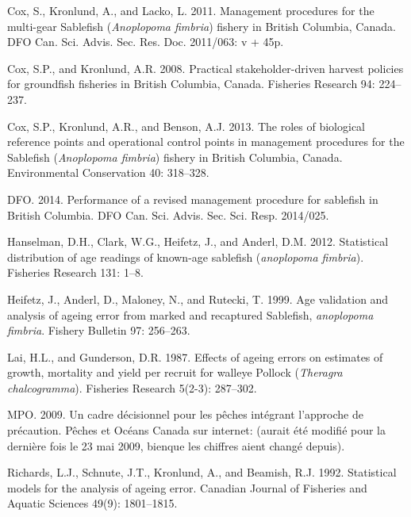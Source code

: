 \documentclass[11pt]{book}
\begin{document}
\leavevmode\hypertarget{ref-cox2011management}{}%
Cox, S., Kronlund, A., and Lacko, L. 2011. Management procedures for the multi-gear Sablefish (\emph{Anoplopoma fimbria}) fishery in British Columbia, Canada. DFO Can. Sci. Advis. Sec. Res. Doc. 2011/063: v + 45p.

\leavevmode\hypertarget{ref-cox2008practical}{}%
Cox, S.P., and Kronlund, A.R. 2008. Practical stakeholder-driven harvest policies for groundfish fisheries in British Columbia, Canada. Fisheries Research 94: 224--237.

\leavevmode\hypertarget{ref-cox2013roles}{}%
Cox, S.P., Kronlund, A.R., and Benson, A.J. 2013. The roles of biological reference points and operational control points in management procedures for the Sablefish (\emph{Anoplopoma fimbria}) fishery in British Columbia, Canada. Environmental Conservation 40: 318--328.

\leavevmode\hypertarget{ref-dfo2014performanc}{}%
DFO. 2014. Performance of a revised management procedure for sablefish in British Columbia. DFO Can. Sci. Advis. Sec. Sci. Resp. 2014/025.

\leavevmode\hypertarget{ref-hanselman2012statistical}{}%
Hanselman, D.H., Clark, W.G., Heifetz, J., and Anderl, D.M. 2012. Statistical distribution of age readings of known-age sablefish (\emph{anoplopoma fimbria}). Fisheries Research 131: 1--8.

\leavevmode\hypertarget{ref-heifetz1999age}{}%
Heifetz, J., Anderl, D., Maloney, N., and Rutecki, T. 1999. Age validation and analysis of ageing error from marked and recaptured Sablefish, \emph{anoplopoma fimbria}. Fishery Bulletin 97: 256--263.

\leavevmode\hypertarget{ref-lai1987effects}{}%
Lai, H.L., and Gunderson, D.R. 1987. Effects of ageing errors on estimates of growth, mortality and yield per recruit for walleye Pollock (\emph{Theragra chalcogramma}). Fisheries Research 5(2-3): 287--302.

\leavevmode\hypertarget{ref-DFO2009}{}%
MPO. 2009. Un cadre décisionnel pour les pêches intégrant l'approche de précaution. Pêches et Océans Canada sur internet: (aurait été modifié pour la dernière fois le 23 mai 2009, bienque les chiffres aient changé depuis).

\leavevmode\hypertarget{ref-richards1992statistical}{}%
Richards, L.J., Schnute, J.T., Kronlund, A., and Beamish, R.J. 1992. Statistical models for the analysis of ageing error. Canadian Journal of Fisheries and Aquatic Sciences 49(9): 1801--1815.
\end{document}
